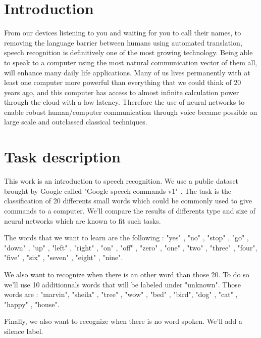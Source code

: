 \section{Introduction}
From our devices listening to you and waiting for you to call their names, to removing the language barrier between humans using automated translation, speech recognition is definitively one of the most growing technology. Being able to speak to a computer using the most natural communication vector of them all, will enhance many daily life applications. Many of us lives permanently with at least one computer more powerful than everything that we could think of 20 years ago, and this computer has access to almost infinite calculation power through the cloud with a low latency. Therefore the use of neural networks to enable robust human/computer communication through voice became possible on large scale and outclassed classical techniques.

\section{Task description}

This work is an introduction to speech recognition. We use a public dataset brought by Google called "Google speech commands v1" \cite{dataset}. The task is the classification of 20 differents small words which could be commonly used to give commands to a computer. We'll compare the results of differents type and size of neural networks which are known to fit such tasks.

\vspace{5mm}

The words that we want to learn are the following : "yes" ,  "no" , "stop" , "go" , "down" , "up" , "left" , "right" , "on" , "off" , "zero" , "one" , "two" , "three" , "four", "five" , "six" , "seven" , "eight" , "nine".

\vspace{5mm}

We also want to recognize when there is an other word than those 20. To do so we'll use 10 additionnals words that will be labeled under "unknown". Those words are  :  "marvin", "sheila" , "tree" , "wow" , "bed" , "bird", "dog" , "cat" , "happy" , "house". 

\vspace{5mm}

Finally, we also want to recognize when there is no word spoken. We'll add a silence label.
